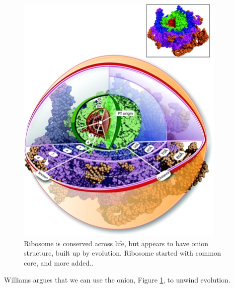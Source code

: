 \documentclass[]{article}
\begin{document}
\begin{figure}[H]
	\caption[Ribosome is conserved across life]{Ribosome is conserved across life, but appears to have onion structure, built up by evolution. Ribosome started with common core, and more added.\cite{hsiao2009peeling}.}\label{fig:Ribosome} 
	\includegraphics[width=0.9\textwidth]{Ribosome}
\end{figure}
Williams argues that we can use the onion, Figure \ref{fig:Ribosome}, to unwind evolution.
\end{document}
